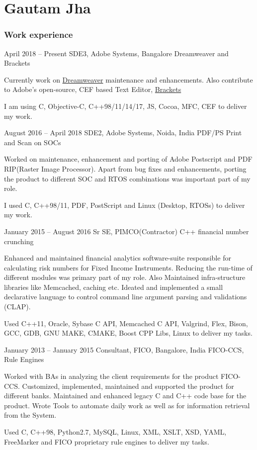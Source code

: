 \part{Gautam Jha}

\section{Work experience}

\begin{eventlist}

\item{April 2018 -- Present}
     {SDE3, Adobe Systems, Bangalore}
     {Dreamweaver and Brackets}
     
Currently work on \href{https://www.adobe.com/in/products/dreamweaver.html}{Dreamweaver} maintenance and enhancements. Also contribute to Adobe's open-source, CEF based Text Editor, \href{https://github.com/adobe/brackets}{Brackets}

I am using C, Objective-C, C++98/11/14/17, JS, Cocoa, MFC, CEF to deliver my work.

\item{August 2016 -- April 2018}
     {SDE2, Adobe Systems, Noida, India}
     {PDF/PS Print and Scan on SOCs}

Worked on maintenance, enhancement and porting of Adobe Postscript and PDF RIP(Raster Image Processor). Apart from bug fixes and enhancements, porting the product to different SOC and RTOS combinations was important part of my role.

I used C, C++98/11, PDF, PostScript and Linux (Desktop, RTOSs) to deliver my work.

\item{January 2015 -- August 2016}
     {Sr SE, PIMCO(Contractor)}
     {C++ financial number crunching}

Enhanced and maintained financial analytics software-suite responsible for calculating risk numbers for Fixed Income Instruments. Reducing the run-time of different modules was primary part of my role. Also Maintained infra-structure libraries like Memcached, caching etc.
Ideated and implemented a small declarative language to control command line argument
parsing and validations (CLAP).

Used C++11, Oracle, Sybase C API, Memcached C API, Valgrind, Flex, Bison, GCC, GDB, GNU
MAKE, CMAKE, Boost CPP Libs, Linux to deliver my tasks.

\item{January 2013 -- January 2015}
     {Consultant, FICO, Bangalore, India}
     {FICO-CCS, Rule Engines}

Worked with BAs in analyzing the client requirements for the product FICO-CCS.
Customized, implemented, maintained and supported the product for different banks.
Maintained and enhanced legacy C and C++ code base for the product.
Wrote Tools to automate daily work as well as for information retrieval from the System.

Used C, C++98, Python2.7, MySQL, Linux, XML, XSLT, XSD, YAML, FreeMarker and FICO
proprietary rule engines to deliver my tasks.
\end{eventlist}

